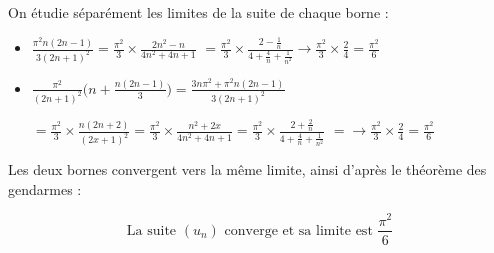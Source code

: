\documentclass[11pt]{article}
\newcommand{\bfrac}[2]{\displaystyle\frac{#1}{#2}}
\begin{document}
\vspace{5px}

\noindent On étudie séparément les limites de la suite de chaque borne :

\begin{itemize}
  \item {
    $\bfrac{\pi^2 n(2n-1)}{3(2n+1)^2} = \bfrac{\pi^2}{3} \times \bfrac{2n^2-n}{4n^2 + 4n + 1}$
    $=  \bfrac{\pi^2}{3} \times \bfrac{2-\tfrac{1}{n}}{4+\tfrac{4}{n}+\tfrac{1}{n^2}} \longrightarrow \bfrac{\pi^2}{3} \times \bfrac{2}{4} = \bfrac{\pi^2}{6}$
  }
  \item {
    $\bfrac{\pi^2}{(2n+1)^2} \Bigg( n + \bfrac{n(2n-1)}{3} \Bigg) = \bfrac{3n\pi^2 + \pi^2 n(2n-1)}{3(2n+1)^2}$
    
    $= \bfrac{\pi^2}{3} \times \bfrac{n(2n+2)}{(2x+1)^2} = \bfrac{\pi^2}{3} \times \bfrac{n^2+2x}{4n^2+4n+1} = \bfrac{\pi^2}{3} \times \bfrac{2+\tfrac{2}{n}}{4+\tfrac{4}{n}+\tfrac{1}{n^2}}$
    $=  \longrightarrow \bfrac{\pi^2}{3} \times \bfrac{2}{4} = \bfrac{\pi^2}{6}$
  }
\end{itemize}

\noindent Les deux bornes convergent vers la même limite, ainsi d'après le théorème des gendarmes :

\[\boxed{\; \text{La suite $(u_n)$ converge et sa limite est $\bfrac{\pi^2}{6}$} \;}\]
\end{document}
